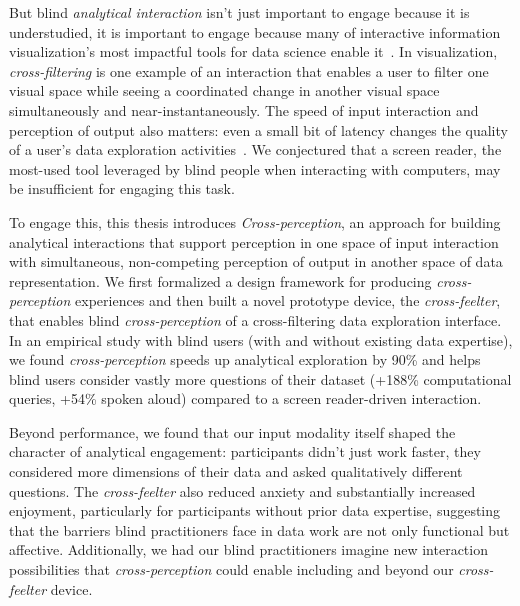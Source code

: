 \documentclass[12pt]{cmuthesis}
\begin{document}
But blind \textit{analytical interaction} isn't just important to engage because it is understudied, it is important to engage because many of interactive information visualization's most impactful tools for data science enable it~\cite{Flowers1997Cross,Weaver2008,Moritz2019,heer_mosaic_2023}. In visualization, \textit{cross-filtering} is one example of an interaction that enables a user to filter one visual space while seeing a coordinated change in another visual space simultaneously and near-instantaneously. The speed of input interaction and perception of output also matters: even a small bit of latency changes the quality of a user's data exploration activities~\cite{Liu2014}. We conjectured that a screen reader, the most-used tool leveraged by blind people when interacting with computers, may be insufficient for engaging this task.

To engage this, this thesis introduces \textit{Cross-perception}, an approach for building analytical interactions that support perception in one space of input interaction with simultaneous, non-competing perception of output in another space of data representation. We first formalized a design framework for producing \textit{cross-perception} experiences and then built a novel prototype device, the \textit{cross-feelter}, that enables blind \textit{cross-perception} of a cross-filtering data exploration interface. In an empirical study with blind users (with and without existing data expertise), we found \textit{cross-perception} speeds up analytical exploration by 90\% and helps blind users consider vastly more questions of their dataset (+188\% computational queries, +54\% spoken aloud) compared to a screen reader-driven interaction.

Beyond performance, we found that our input modality itself shaped the character of analytical engagement: participants didn't just work faster, they considered more dimensions of their data and asked qualitatively different questions. The \textit{cross-feelter} also reduced anxiety and substantially increased enjoyment, particularly for participants without prior data expertise, suggesting that the barriers blind practitioners face in data work are not only functional but affective. Additionally, we had our blind practitioners imagine new interaction possibilities that \textit{cross-perception} could enable including and beyond our \textit{cross-feelter} device.
\end{document}
